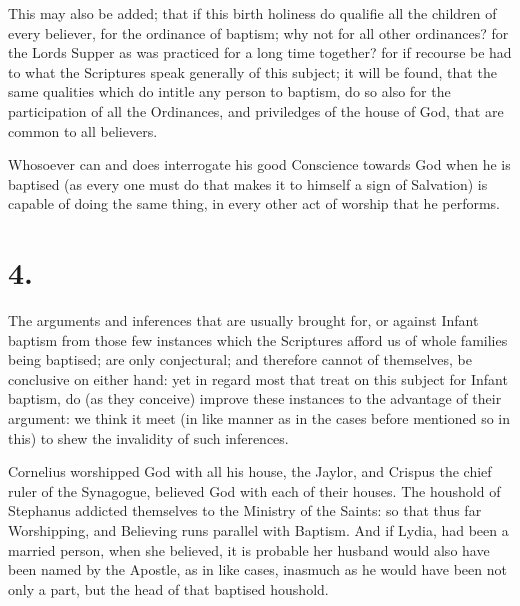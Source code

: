 \documentclass[12pt,a4paper]{book}
\begin{document}
This may also be added; that if this birth holiness do qualifie all the children of every believer, for the ordinance of baptism; why not for all other ordinances? for the Lords Supper as was practiced for a long time together? for if recourse be had to what the Scriptures speak generally of this subject; it will be found, that the same qualities which do intitle any person to baptism, do so also for the participation of all the Ordinances, and priviledges of the house of God, that are common to all believers.

Whosoever can and does interrogate his good Conscience towards God when he is baptised (as every one must do that makes it to himself a sign of Salvation) is capable of doing the same thing, in every other act of worship that he performs.

\section*{4.}
The arguments and inferences that are usually brought for, or against Infant baptism from those few instances which the Scriptures afford us of whole families being baptised; are only conjectural; and therefore cannot of themselves, be conclusive on either hand: yet in regard most that treat on this subject for Infant baptism, do (as they conceive) improve these instances to the advantage of their argument: we think it meet (in like manner as in the cases before mentioned so in this) to shew the invalidity of such inferences.

Cornelius worshipped God with all his house, the Jaylor, and Crispus the chief ruler of the Synagogue, believed God with each of their houses. The houshold of Stephanus addicted themselves to the Ministry of the Saints: so that thus far Worshipping, and Believing runs parallel with Baptism. And if Lydia, had been a married person, when she believed, it is probable her husband would also have been named by the Apostle, as in like cases, inasmuch as he would have been not only a part, but the head of that baptised houshold.
\end{document}
